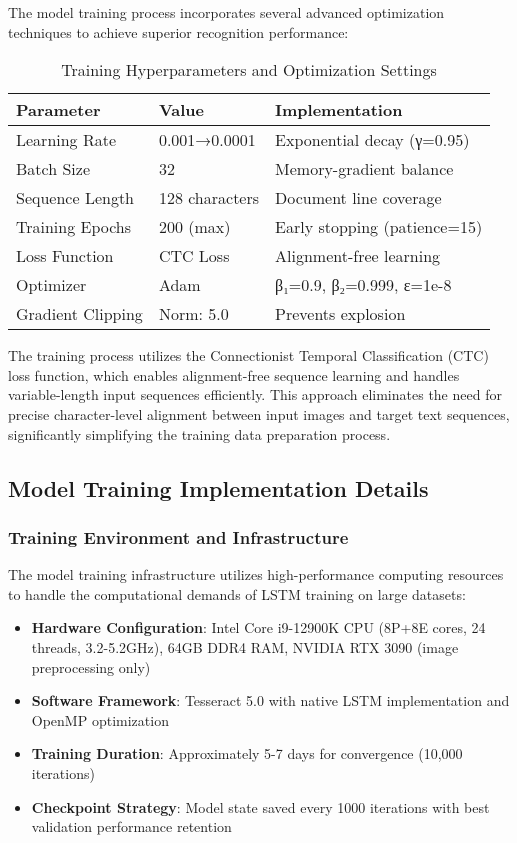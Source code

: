 The model training process incorporates several advanced optimization techniques to achieve superior recognition performance:

\begin{table}[H]
\centering
\caption{Training Hyperparameters and Optimization Settings}
\label{tab:training_config}
{\begin{tabular}{lll}
\toprule
\textbf{Parameter} & \textbf{Value} & \textbf{Implementation} \\
\midrule
Learning Rate & 0.001→0.0001 & Exponential decay (γ=0.95) \\
Batch Size & 32 & Memory-gradient balance \\
Sequence Length & 128 characters & Document line coverage \\
Training Epochs & 200 (max) & Early stopping (patience=15) \\
Loss Function & CTC Loss & Alignment-free learning \\
Optimizer & Adam & β₁=0.9, β₂=0.999, ε=1e-8 \\
Gradient Clipping & Norm: 5.0 & Prevents explosion \\
\bottomrule
\end{tabular}}
\end{table}

The training process utilizes the Connectionist Temporal Classification (CTC) loss function, which enables alignment-free sequence learning and handles variable-length input sequences efficiently. This approach eliminates the need for precise character-level alignment between input images and target text sequences, significantly simplifying the training data preparation process.

\subsection{Model Training Implementation Details}

\subsubsection{Training Environment and Infrastructure}

The model training infrastructure utilizes high-performance computing resources to handle the computational demands of LSTM training on large datasets:

\begin{itemize}
\item \textbf{Hardware Configuration}: Intel Core i9-12900K CPU (8P+8E cores, 24 threads, 3.2-5.2GHz), 64GB DDR4 RAM, NVIDIA RTX 3090 (image preprocessing only)
\item \textbf{Software Framework}: Tesseract 5.0 with native LSTM implementation and OpenMP optimization
\item \textbf{Training Duration}: Approximately 5-7 days for convergence (10,000 iterations)
\item \textbf{Checkpoint Strategy}: Model state saved every 1000 iterations with best validation performance retention
\end{itemize}

